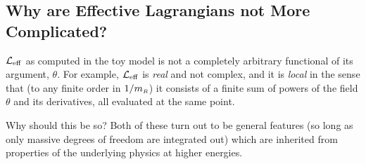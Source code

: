 \subsection{Why are Effective Lagrangians not More Complicated?}

${\cal L}_{\rm eff}$ as computed in the toy model is
not a completely arbitrary functional of its argument, $\theta$.
For example, ${\cal L}_{\rm eff}$ is {\sl real} and not
complex, and it is {\sl local} in the sense that 
(to any finite order in $1/m_{\scriptscriptstyle R}$) 
it consists of a finite sum of powers of the field $\theta$
and its derivatives, all evaluated at the same point. 

Why should this be so?
Both of these turn out to be general features (so long as 
only massive degrees of freedom are integrated out) which
are inherited from properties of the underlying physics at
higher energies. 

